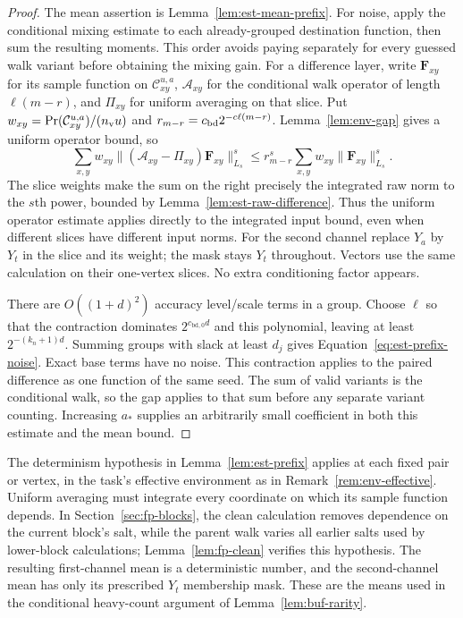 \documentclass[11pt]{article}
\numberwithin{equation}{section}
\theoremstyle{definition}
\theoremstyle{remark}
\begin{document}
\begin{proof}
The mean assertion is Lemma~\ref{lem:est-mean-prefix}. For noise, apply the conditional mixing estimate to each already-grouped destination function, then sum the resulting moments. This order avoids paying separately for every guessed walk variant before obtaining the mixing gain.
For a difference layer, write ${\mathbf{F}}_{xy}$ for its sample function on
$\mathcal C_{xy}^{u,a}$, $\mathcal A_{xy}$ for the conditional walk
operator of length $\ell({m}-{r})$, and $\Pi_{xy}$ for uniform averaging
on that slice.  Put
$w_{xy}=\Pr(\mathcal C_{xy}^{u,a})/({n_{\rm v}}u)$ and
$r_{{m}-{r}}={c_{\rm bd}}2^{-c\ell({m}-{r})}$.
Lemma~\ref{lem:env-gap} gives a uniform operator bound, so
\[
 \sum_{x,y}w_{xy}
   \|(\mathcal A_{xy}-\Pi_{xy}){\mathbf{F}}_{xy}\|_{L_s}^s
 \le r_{{m}-{r}}^s
   \sum_{x,y}w_{xy}\|{\mathbf{F}}_{xy}\|_{L_s}^s.
\]
The slice weights make the sum on the right precisely the integrated raw
norm to the $s$th power, bounded by Lemma~\ref{lem:est-raw-difference}.
Thus the uniform operator estimate applies directly to the integrated
input bound, even when different slices have different input norms.
For the second channel replace $Y_a$ by $Y_t$ in the slice and its
weight; the mask stays $Y_t$ throughout.  Vectors use the same
calculation on their one-vertex slices.  No extra conditioning factor
appears.

There are $O((1+d)^2)$ accuracy level/scale terms in a group.  Choose $\ell$ so
that the contraction dominates $2^{{c_{\mathrm{bd},0}}d}$ and this polynomial, leaving
at least $2^{-({k}_n+1)d}$.  Summing groups with slack at least $d_j$ gives
Equation~\eqref{eq:est-prefix-noise}.  Exact base terms have no noise.
This contraction applies to the paired difference as one function of the
same seed.  The sum of valid variants is the conditional walk, so the
gap applies to that sum before any separate variant counting.
Increasing ${a}_*$ supplies an
arbitrarily small coefficient in both this estimate and the mean bound.
\end{proof}

The determinism hypothesis in Lemma~\ref{lem:est-prefix} applies at
each fixed pair or vertex, in the task's effective environment as in
Remark~\ref{rem:env-effective}.  Uniform averaging must integrate every
coordinate on which its sample function depends.  In
Section~\ref{sec:fp-blocks}, the clean calculation removes dependence
on the current block's salt, while the parent walk varies all earlier
salts used by lower-block calculations; Lemma~\ref{lem:fp-clean}
verifies this hypothesis.  The resulting first-channel mean is a
deterministic number, and the second-channel mean has only its prescribed
$Y_t$ membership mask.  These are the means used in the conditional
heavy-count argument of Lemma~\ref{lem:buf-rarity}.
\end{document}
